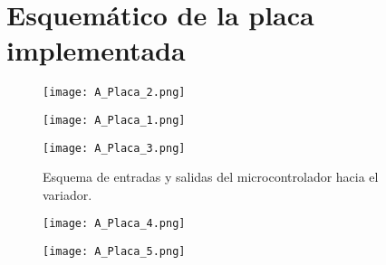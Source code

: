 \section{Esquemático de la placa implementada}
\begin{figure}[H]
	\centering
	\texttt{[image: A\_Placa\_2.png]}
\end{figure}
\begin{figure}[H]
	\centering	\texttt{[image: A\_Placa\_1.png]}
\end{figure}
\begin{figure}[H]
	\centering
	\texttt{[image: A\_Placa\_3.png]}
	
	\caption{Esquema de entradas y salidas del microcontrolador hacia el variador.} 
\end{figure}
\begin{figure}[H]
	\centering	\texttt{[image: A\_Placa\_4.png]}
\end{figure}	
\begin{figure}[H]
	\centering	\texttt{[image: A\_Placa\_5.png]}
\end{figure}



